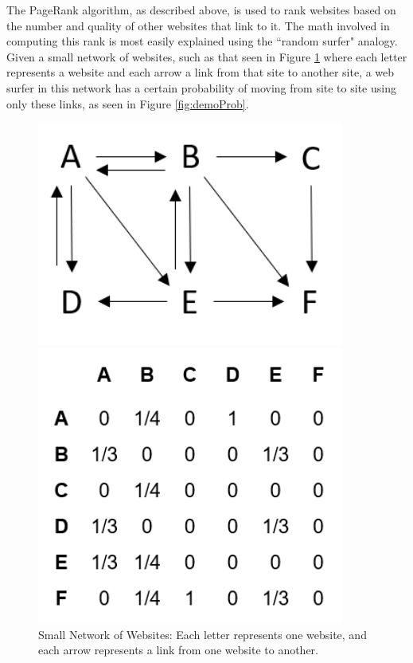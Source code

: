 \documentclass[]{report}   %
\begin{document}
The PageRank algorithm, as described above, is used to rank websites based on the number and quality of other websites that link to it. The math involved in computing this rank is most easily explained using the ``random surfer" analogy. Given a small network of websites, such as that seen in Figure \ref{fig:demoNet} where each letter represents a website and each arrow a link from that site to another site, a web surfer in this network has a certain probability of moving from site to site using only these links, as seen in Figure \ref{fig:demoProb}. 
\begin{figure}[h]
    \centering
    \begin{minipage}[t]{0.48\textwidth}
	\captionsetup{font=scriptsize}
        \centering
        \includegraphics[width=0.9\textwidth]{Marbut_DemoNetwork.png} %
        \caption{Small Network of Websites: Each letter represents one website, and each arrow represents a link from one website to another.}
	  \label{fig:demoNet}
    \end{minipage}\hfill
    \begin{minipage}[t]{0.48\textwidth}
	\captionsetup{font=scriptsize}
        \centering
        \includegraphics[width=0.9\textwidth]{Marbut_DemoMatrix.png} %

\end{minipage}
\end{figure}
\end{document}

